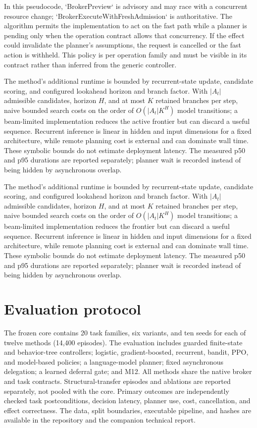 \documentclass[11pt]{article}
\begin{document}
In this pseudocode, `BrokerPreview` is advisory and may race with a concurrent resource change; `BrokerExecuteWithFreshAdmission` is authoritative. The algorithm permits the implementation to act on the fast path while a planner is pending only when the operation contract allows that concurrency. If the effect could invalidate the planner's assumptions, the request is cancelled or the fast action is withheld. This policy is per operation family and must be visible in its contract rather than inferred from the generic controller.

The method's additional runtime is bounded by recurrent-state update, candidate scoring, and configured lookahead horizon and branch factor. With $|A_t|$ admissible candidates, horizon $H$, and at most $K$ retained branches per step, naive bounded search costs on the order of $O(|A_t|K^H)$ model transitions; a beam-limited implementation reduces the active frontier but can discard a useful sequence. Recurrent inference is linear in hidden and input dimensions for a fixed architecture, while remote planning cost is external and can dominate wall time. These symbolic bounds do not estimate deployment latency. The measured p50 and p95 durations are reported separately; planner wait is recorded instead of being hidden by asynchronous overlap.

The method's additional runtime is bounded by recurrent-state update, candidate scoring, and configured lookahead horizon and branch factor. With $|A_t|$ admissible candidates, horizon $H$, and at most $K$ retained branches per step, naive bounded search costs on the order of $O(|A_t|K^H)$ model transitions; a beam-limited implementation reduces the frontier but can discard a useful sequence. Recurrent inference is linear in hidden and input dimensions for a fixed architecture, while remote planning cost is external and can dominate wall time. These symbolic bounds do not estimate deployment latency. The measured p50 and p95 durations are reported separately; planner wait is recorded instead of being hidden by asynchronous overlap.

\section{Evaluation protocol}
The frozen core contains 20 task families, six variants, and ten seeds for each of twelve methods (14,400 episodes). The evaluation includes guarded finite-state and behavior-tree controllers; logistic, gradient-boosted, recurrent, bandit, PPO, and model-based policies; a language-model planner; fixed asynchronous delegation; a learned deferral gate; and M12. All methods share the native broker and task contracts. Structural-transfer episodes and ablations are reported separately, not pooled with the core. Primary outcomes are independently checked task postconditions, decision latency, planner use, cost, cancellation, and effect correctness. The data, split boundaries, executable pipeline, and hashes are available in the repository and the companion technical report.
\end{document}
